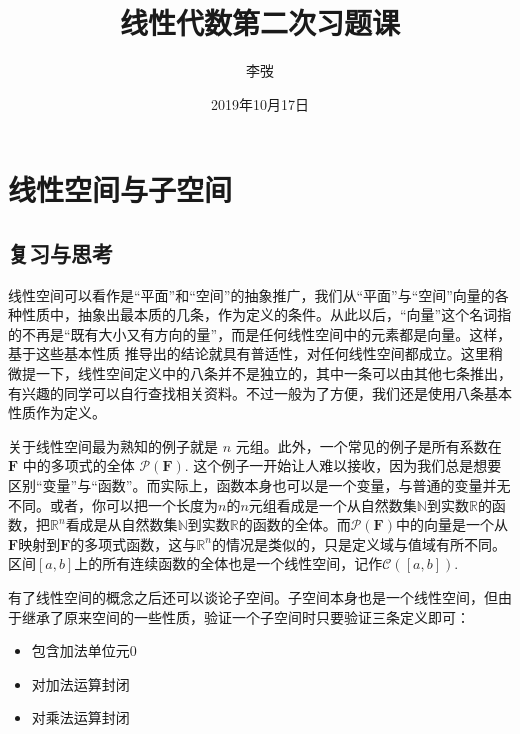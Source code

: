 \documentclass[hyperref,]{ctexart}
\title{线性代数第二次习题课}
\author{李弢}
\date{2019年10月17日}
\providecommand{\tightlist}{%
  \setlength{\itemsep}{0pt}\setlength{\parskip}{0pt}}
\begin{document}
\maketitle

{
\setcounter{tocdepth}{2}
\tableofcontents
}
\def\vec{\overrightarrow} \def\bfF{\mathbf{F}} \def\calP{\mathcal{P}}
\def\calC{\mathcal{C}} \def\calL{\mathcal{L}} \def\R{\mathbb{R}}
\def\N{\mathbb{N}} \def\Z{\mathbb{Z}} \def\span{\mathrm{span}\,}
\def\dim{\mathrm{dim}\,} \def\Null{\mathrm{null}\,}
\def\range{\mathrm{range}\,}

\section{线性空间与子空间}\label{ux7ebfux6027ux7a7aux95f4ux4e0eux5b50ux7a7aux95f4}

\subsection{复习与思考}\label{ux590dux4e60ux4e0eux601dux8003}

线性空间可以看作是``平面''和``空间''的抽象推广，我们从``平面''与``空间''向量的各种性质中，抽象出最本质的几条，作为定义的条件。从此以后，``向量''这个名词指的不再是``既有大小又有方向的量''，而是任何线性空间中的元素都是向量。这样，基于这些基本性质
推导出的结论就具有普适性，对任何线性空间都成立。这里稍微提一下，线性空间定义中的八条并不是独立的，其中一条可以由其他七条推出，有兴趣的同学可以自行查找相关资料。不过一般为了方便，我们还是使用八条基本性质作为定义。

关于线性空间最为熟知的例子就是 \(n\)
元组。此外，一个常见的例子是所有系数在 \(\bfF\) 中的多项式的全体
\(\calP(\bfF)\).
这个例子一开始让人难以接收，因为我们总是想要区别``变量''与``函数''。而实际上，函数本身也可以是一个变量，与普通的变量并无不同。或者，你可以把一个长度为\(n\)的\(n\)元组看成是一个从自然数集\(\N\)到实数\(\R\)的函数，把\(\R^n\)看成是从自然数集\(\N\)到实数\(\R\)的函数的全体。而\(\calP(\bfF)\)中的向量是一个从\(\bfF\)映射到\(\bfF\)的多项式函数，这与\(\R^n\)的情况是类似的，只是定义域与值域有所不同。区间\([a,b]\)上的所有连续函数的全体也是一个线性空间，记作\(\calC([a,b])\).

有了线性空间的概念之后还可以谈论子空间。子空间本身也是一个线性空间，但由于继承了原来空间的一些性质，验证一个子空间时只要验证三条定义即可：

\begin{itemize}
\tightlist
\item
  包含加法单位元\(0\)
\item
  对加法运算封闭
\item
  对乘法运算封闭
\end{itemize}
\end{document}
